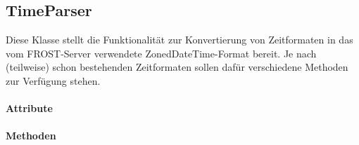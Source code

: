 \subsection{TimeParser}


Diese Klasse stellt die Funktionalität zur Konvertierung von Zeitformaten in das vom FROST-Server verwendete ZonedDateTime-Format bereit.
Je nach (teilweise) schon bestehenden Zeitformaten sollen dafür verschiedene Methoden zur Verfügung stehen.

\paragraph{Attribute}
\paragraph{Methoden}

